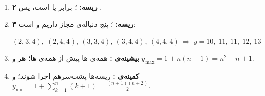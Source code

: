 \begin{enumerate}
  \item \textbf{۲ ریسه:} ؛  برابر  یا  است، پس .
  \item \textbf{۳ ریسه:} ؛ پنج دنباله‌ی مجاز  داریم و  است:
  \begin{center}\mbox{$(2,3,4),\ (2,4,4),\ (3,3,4),\ (3,4,4),\ (4,4,4)\ \Rightarrow\ y=10,\ 11,\ 11,\ 12,\ 13$}\end{center}
  \item \textbf{بیشینه‌ی :} همه‌ی ها پیش از همه‌ی ها؛ هر  و
  \mbox{$y_{\max}=1+n(n+1)=n^2+n+1$}.
  \item \textbf{کمینه‌ی :} ریسه‌ها پشت‌سرهم اجرا شوند؛  و
  \mbox{$y_{\min}=1+\sum_{k=1}^{n}(k+1)=\frac{(n+1)(n+2)}{2}$}.
\end{enumerate}
